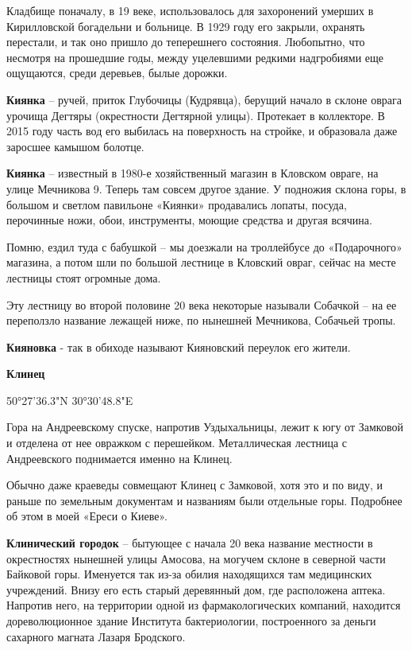 Кладбище поначалу, в 19 веке, использовалось для захоронений умерших в Кирилловской богадельни и больнице. В 1929 году его закрыли, охранять перестали, и так оно пришло до теперешнего состояния. Любопытно, что несмотря на прошедшие годы, между уцелевшими редкими надгробиями еще ощущаются, среди деревьев, былые дорожки.\\


\medskip


\textbf{Киянка} – ручей, приток Глубочицы (Кудрявца), берущий начало в склоне оврага урочища Дегтяры (окрестности Дегтярной улицы). Протекает в коллекторе. В 2015 году часть вод его выбилась на поверхность на стройке, и образовала даже заросшее камышом болотце.\\


\medskip


\textbf{Киянка} – известный в 1980-е хозяйственный магазин в Кловском овраге, на улице Мечникова 9. Теперь там совсем другое здание. У подножия склона горы, в большом и светлом павильоне «Киянки» продавались лопаты, посуда, перочинные ножи, обои, инструменты, моющие средства и другая всячина.

Помню, ездил туда с бабушкой – мы доезжали на троллейбусе до «Подарочного» магазина, а потом шли по большой лестнице в Кловский овраг, сейчас на месте лестницы стоят огромные дома.

Эту лестницу во второй половине 20 века некоторые называли Собачкой – на ее переползло название лежащей ниже, по нынешней Мечникова, Собачьей тропы.\\


\medskip

\textbf{Кияновка} - так в обиходе называют Кияновский переулок его жители.\\

\medskip

\textbf{Клинец}

50°27'36.3"N 30°30'48.8"E

Гора на Андреевскому спуске, напротив Уздыхальницы, лежит к югу от Замковой и отделена от нее овражком с перешейком. Металлическая лестница с Андреевского поднимается именно на Клинец. 

Обычно даже краеведы совмещают Клинец с Замковой, хотя это и по виду, и раньше по земельным документам и названиям были отдельные горы. Подробнее об этом в моей «Ереси о Киеве».\\

\medskip


\textbf{Клинический городок} – бытующее с начала 20 века название местности в окрестностях нынешней улицы Амосова, на могучем склоне в северной части Байковой горы. Именуется так из-за обилия находящихся там медицинских учреждений. Внизу его есть старый деревянный дом, где расположена аптека. Напротив него, на территории одной из фармакологических компаний, находится дореволюционное здание Института бактериологии, построенного за деньги сахарного магната Лазаря Бродского.

